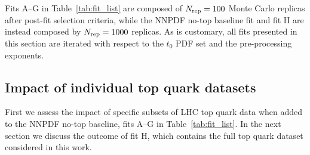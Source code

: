 \documentclass[withindex,glossary]{cam-thesis}
\begin{document}
 Fits A--G in Table~\ref{tab:fit_list}  are composed of $N_{\rm rep}=100$ Monte Carlo replicas after post-fit selection criteria, while the NNPDF no-top baseline fit and fit H are instead composed by $N_{\rm rep}=1000$  replicas.
%
 As is customary, all fits presented in this section are iterated with respect
 to the $t_0$ PDF set and the pre-processing exponents.



\subsection{Impact of individual top quark datasets}
\label{sec:individual}

First we assess the impact of specific subsets of LHC top quark data when added
to the NNPDF no-top baseline, fits A--G in Table~\ref{tab:fit_list}. 
In the next section we discuss the outcome of fit H, which contains the full
top quark dataset considered in this work.
\end{document}
